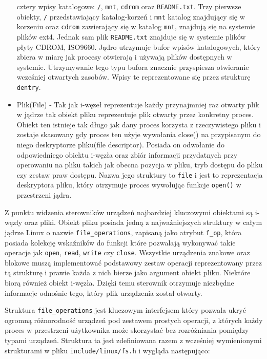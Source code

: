\begin{itemize}
  cztery wpisy katalogowe: \texttt{/}, \texttt{mnt}, \texttt{cdrom} oraz
  \texttt{README.txt}. Trzy pierwsze obiekty, \texttt{/} przedstawiający
  katalog-korzeń i \texttt{mnt} katalog znajdujący się w korzeniu oraz
  \texttt{cdrom} zawierający się w katalog \texttt{mnt}, znajdują się na
  systemie plików ext4. Jednak sam plik \texttt{README.txt} znajduje się
  w systemie plików płyty CDROM, ISO9660. Jądro utrzymuje bufor wpisów
  katalogowych, który zbiera w miarę jak procesy otwierają i używają
  plików dostępnych w systemie. Utrzymywanie tego typu bufora znacznie
  przyspiesza otwieranie wcześniej otwartych zasobów. Wpisy te
  reprezentowane się przez strukturę \texttt{dentry}.
\item
  Plik(File) - Tak jak i-węzeł reprezentuje każdy przynajmniej raz
  otwarty plik w jądrze tak obiekt pliku reprezentuje plik otwarty przez
  konkretny proces. Obiekt ten istnieje tak długo jak dany proces
  korzysta z rzeczywistego pliku i zostaje skasowany gdy proces ten
  użyje wywołania close() na przypisanym do niego deskryptorze
  pliku(file descriptor). Posiada on odwołanie do odpowiedniego obiektu
  i-węzła oraz zbiór informacji przydatnych przy operowaniu na pliku
  takich jak obecna pozycja w pliku, tryb dostępu do pliku czy zestaw
  praw dostępu. Nazwa jego struktury to \texttt{file} i jest to
  reprezentacja deskryptora pliku, który otrzymuje proces wywołując
  funkcje \texttt{open()} w przestrzeni jądra.
\end{itemize}

Z punktu widzenia sterowników urządzeń najbardziej kluczowymi obiektami
są i-węzły oraz pliki. Obiekt pliku posiada jedną z najważniejszych
struktury w całym jądrze Linux o nazwie \texttt{file\_operations},
zapisaną jako atrybut \texttt{f\_op}, która posiada kolekcję wskaźników
do funkcji które pozwalają wykonywać takie operacje jak \texttt{open},
\texttt{read}, \texttt{write} czy \texttt{close}. Wszystkie urządzenia
znakowe oraz blokowe muszą implementować podstawowy zestaw operacji
reprezentowany przez tą strukturę i prawie każda z nich bierze jako
argument obiekt pliku. Niektóre biorą również obiekt i-węzła. Dzięki
temu sterownik otrzymuje niezbędne informacje odnośnie tego, który plik
urządzenia został otwarty.

Struktura \texttt{file\_operations} jest kluczowym interfejsem który
pozwala ukryć ogromną różnorodność urządzeń pod zestawem prostych
operacji, z których każdy proces w przestrzeni użytkownika może
skorzystać bez rozróżniania pomiędzy typami urządzeń. Struktura ta jest
zdefiniowana razem z wcześniej wymienionymi strukturami w pliku
\texttt{include/linux/fs.h} i wygląda następująco:

